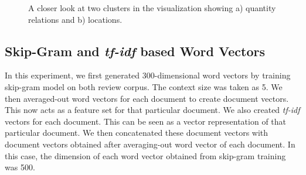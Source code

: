 \def\DevnagVersion{2.15}\documentclass[11pt]{article}
\begin{document}


\begin{figure}[ht!]
\centering
{}
\caption{A closer look at two clusters in the visualization showing a) quantity
relations and b) locations. }
\label{fig:5K_hindi_zoom}
\end{figure}


\subsection{Skip-Gram and \emph{tf-idf} based Word Vectors}
In this experiment, we first generated 300-dimensional word vectors by training skip-gram model on both review corpus. The context size was taken as 5. We then averaged-out word vectors for each document to create document vectors. This now acts as a feature set for that particular document.
We also created \emph{tf-idf} vectors for each document. This can be seen as a vector representation of that particular document. We then concatenated these document vectors with document vectors obtained after averaging-out word vector of each document. In this case, the dimension of each word vector obtained from skip-gram training was 500.
\end{document}
